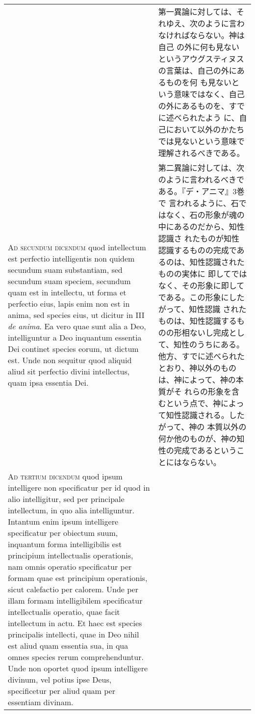 \documentclass[10pt]{jsarticle} %
\begin{document}
\begin{longtable}{p{21em}p{21em}}
&

第一異論に対しては、それゆえ、次のように言わなければならない。神は自己
の外に何も見ないというアウグスティヌスの言葉は、自己の外にあるものを何
も見ないという意味ではなく、自己の外にあるものを、すでに述べられたよう
に、自己において以外のかたちでは見ないという意味で理解されるべきである。

\\

{\scshape Ad secundum dicendum} quod intellectum est perfectio
intelligentis non quidem secundum suam substantiam, sed secundum suam
speciem, secundum quam est in intellectu, ut forma et perfectio eius,
lapis enim non est in anima, sed species eius, ut dicitur in III
{\itshape de anima}. Ea vero quae sunt alia a Deo, intelliguntur a Deo
inquantum essentia Dei continet species eorum, ut dictum est. Unde non
sequitur quod aliquid aliud sit perfectio divini intellectus, quam
ipsa essentia Dei.


&

第二異論に対しては、次のように言われるべきである。『デ・アニマ』3巻で
言われるように、石ではなく、石の形象が魂の中にあるのだから、知性認識さ
れたものが知性認識するものの完成であるのは、知性認識されたものの実体に
即してではなく、その形象に即してである。この形象にしたがって、知性認識
されたものは、知性認識するものの形相ないし完成として、知性のうちにある。
他方、すでに述べられたとおり、神以外のものは、神によって、神の本質がそ
れらの形象を含むという点で、神によって知性認識される。したがって、神の
本質以外の何か他のものが、神の知性の完成であるということにはならない。


\\


{\scshape Ad tertium dicendum} quod ipsum intelligere non specificatur
per id quod in alio intelligitur, sed per principale intellectum, in
quo alia intelliguntur. Intantum enim ipsum intelligere specificatur
per obiectum suum, inquantum forma intelligibilis est principium
intellectualis operationis, nam omnis operatio specificatur per formam
quae est principium operationis, sicut calefactio per calorem. Unde
per illam formam intelligibilem specificatur intellectualis operatio,
quae facit intellectum in actu. Et haec est species principalis
intellecti, quae in Deo nihil est aliud quam essentia sua, in qua
omnes species rerum comprehenduntur. Unde non oportet quod ipsum
intelligere divinum, vel potius ipse Deus, specificetur per aliud quam
per essentiam divinam.


&


\end{longtable}
\end{document}
